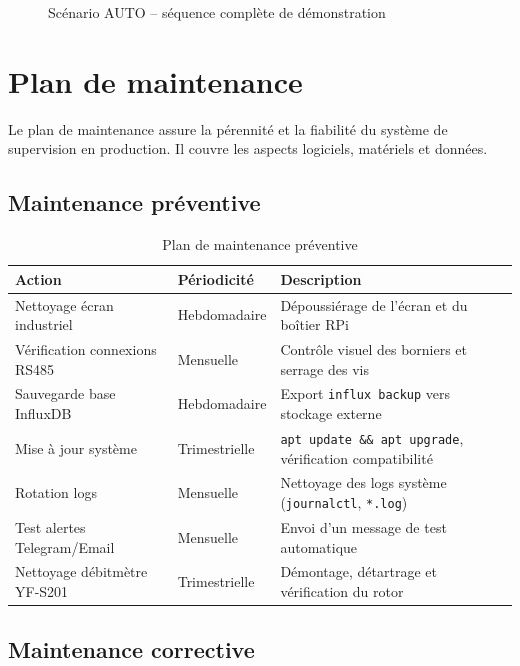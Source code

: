 \begin{figure}[htbp]
  \centering
  \caption{Scénario AUTO -- séquence complète de démonstration}
  \label{fig:demo_auto}
\end{figure}

\section{Plan de maintenance}

Le plan de maintenance assure la pérennité et la fiabilité du système de supervision en production. Il couvre les aspects logiciels, matériels et données.

\subsection{Maintenance préventive}

\begin{table}[htbp]
\centering
\caption{Plan de maintenance préventive}
\label{tab:maintenance_prev}
\begin{tabular}{p{}p{}p{}}
\toprule
\textbf{Action} & \textbf{Périodicité} & \textbf{Description} \\
\midrule
Nettoyage écran industriel & Hebdomadaire & Dépoussiérage de l'écran et du boîtier RPi \\
Vérification connexions RS485 & Mensuelle & Contrôle visuel des borniers et serrage des vis \\
Sauvegarde base InfluxDB & Hebdomadaire & Export \texttt{influx backup} vers stockage externe \\
Mise à jour système & Trimestrielle & \texttt{apt update \&\& apt upgrade}, vérification compatibilité \\
Rotation logs & Mensuelle & Nettoyage des logs système (\texttt{journalctl}, \texttt{*.log}) \\
Test alertes Telegram/Email & Mensuelle & Envoi d'un message de test automatique \\
Nettoyage débitmètre YF-S201 & Trimestrielle & Démontage, détartrage et vérification du rotor \\
\bottomrule
\end{tabular}
\end{table}

\subsection{Maintenance corrective}

